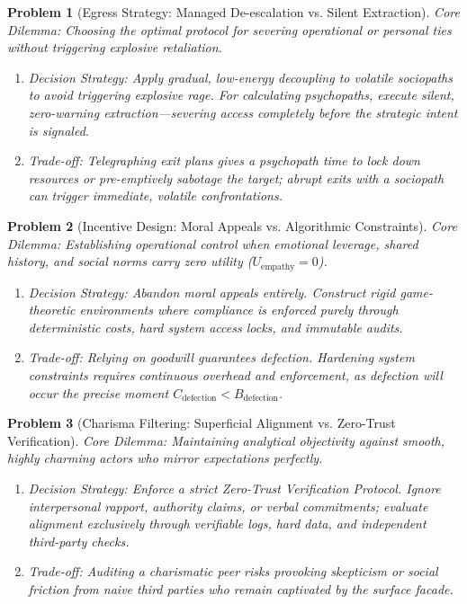 \documentclass{article}
\newtheorem{problem}{Problem}
\begin{document}
\begin{problem}[Egress Strategy: Managed De-escalation vs. Silent Extraction]
	\emph{Core Dilemma:} Choosing the optimal protocol for severing operational or personal ties without triggering explosive retaliation.
	\begin{enumerate}[label=(\roman*)]
		\item \emph{Decision Strategy:} Apply gradual, low-energy decoupling to volatile sociopaths to avoid triggering explosive rage. For calculating psychopaths, execute \textit{silent, zero-warning extraction}---severing access completely before the strategic intent is signaled.
		\item \emph{Trade-off:} Telegraphing exit plans gives a psychopath time to lock down resources or pre-emptively sabotage the target; abrupt exits with a sociopath can trigger immediate, volatile confrontations.
	\end{enumerate}
\end{problem}

\begin{problem}[Incentive Design: Moral Appeals vs. Algorithmic Constraints]
	\emph{Core Dilemma:} Establishing operational control when emotional leverage, shared history, and social norms carry zero utility ($U_{\text{empathy}} = 0$).
	\begin{enumerate}[label=(\roman*)]
		\item \emph{Decision Strategy:} Abandon moral appeals entirely. Construct rigid game-theoretic environments where compliance is enforced purely through deterministic costs, hard system access locks, and immutable audits.
		\item \emph{Trade-off:} Relying on goodwill guarantees defection. Hardening system constraints requires continuous overhead and enforcement, as defection will occur the precise moment $C_{\text{defection}} < B_{\text{defection}}$.
	\end{enumerate}
\end{problem}

\begin{problem}[Charisma Filtering: Superficial Alignment vs. Zero-Trust Verification]
	\emph{Core Dilemma:} Maintaining analytical objectivity against smooth, highly charming actors who mirror expectations perfectly.
	\begin{enumerate}[label=(\roman*)]
		\item \emph{Decision Strategy:} Enforce a strict \textit{Zero-Trust Verification Protocol}. Ignore interpersonal rapport, authority claims, or verbal commitments; evaluate alignment exclusively through verifiable logs, hard data, and independent third-party checks.
		\item \emph{Trade-off:} Auditing a charismatic peer risks provoking skepticism or social friction from naive third parties who remain captivated by the surface facade.
	\end{enumerate}
\end{problem}
\end{document}
